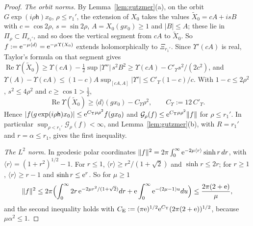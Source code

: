 \begin{proof}
\emph{The orbit norms.} By Lemma~\ref{lem:gutzmer}(a), on the orbit $G\exp(i\rho\mathsf h)x_0$, $\rho\le r_1'$, the extension of $X_0$ takes the
values $\tilde X_0=cA+isB$ with $c=\cos2\rho$, $s=\sin2\rho$, $A=X_0(gx_0)\ge1$ and $|B|\le A$; these lie in $\Pi_\rho\subset \Pi_{r_1'}$, and so does
the vertical segment from $cA$ to $\tilde X_0$. So $f:=\mathrm{e}^{-\mu\langle d\rangle}=\mathrm{e}^{-\mu \Upsilon(X_0)}$ extends holomorphically to $\Xi_{r_1'}$. Since $\Upsilon'(cA)$ is
real, Taylor's formula on that segment gives $\operatorname{Re}\Upsilon(\tilde X_0)\ge \Upsilon(cA)-\tfrac12\sup|\Upsilon''|\,s^2B^2\ge \Upsilon(cA)-C'_\Upsilon s^2/(2c^2)$, and
$\Upsilon(A)-\Upsilon(cA)\le(1-c)A\sup_{[cA,A]}|\Upsilon'|\le C'_\Upsilon(1-c)/c$. With $1-c\le2\rho^2$, $s^2\le4\rho^2$ and $c\ge\cos1>\tfrac12$,
\[
\operatorname{Re}\Upsilon(\tilde X_0)\ge\langle d\rangle(gx_0)-C_\Upsilon\rho^2,\qquad C_\Upsilon:=12\,C'_\Upsilon .
\]
Hence $|f(g\exp(i\rho\mathsf h)x_0)|\le\mathrm{e}^{C_\Upsilon\mu\rho^2}f(gx_0)$ and $\mathcal G_\rho(f)\le\mathrm{e}^{C_\Upsilon\mu\rho^2}\lVert f\rVert$ for $\rho\le r_1'$. In particular
$\sup_{\rho<r_1'}\mathcal G_\rho(f)<\infty$, and Lemma~\ref{lem:gutzmer}(b), with $R=r_1'$ and $r=\alpha\le r_1$, gives the first inequality.

\emph{The $L^2$ norm.} In geodesic polar coordinates $\lVert f\rVert^2=2\pi\int_0^\infty\mathrm{e}^{-2\mu\langle r\rangle}\sinh r\,dr$, with
$\langle r\rangle=(1+r^2)^{1/2}-1$. For $r\le1$, $\langle r\rangle\ge r^2/(1+\sqrt2)$ and $\sinh r\le2r$; for $r\ge1$,
$\langle r\rangle\ge r-1$ and $\sinh r\le\mathrm{e}^r$. So for $\mu\ge1$
\[
\lVert f\rVert^2\le2\pi\Bigl(\int_0^\infty2r\,\mathrm{e}^{-2\mu r^2/(1+\sqrt2)}dr+\mathrm{e}\int_0^\infty\mathrm{e}^{-(2\mu-1)u}du\Bigr)\le\frac{2\pi(2+\mathrm{e})}{\mu},
\]
and the second inequality holds with $C_{\mathrm E}:=(\pi\mathrm{e})^{1/2}\mathrm{e}^{C_\Upsilon}(2\pi(2+\mathrm{e}))^{1/2}$, because $\mu\alpha^2\le1$.
\end{proof}

